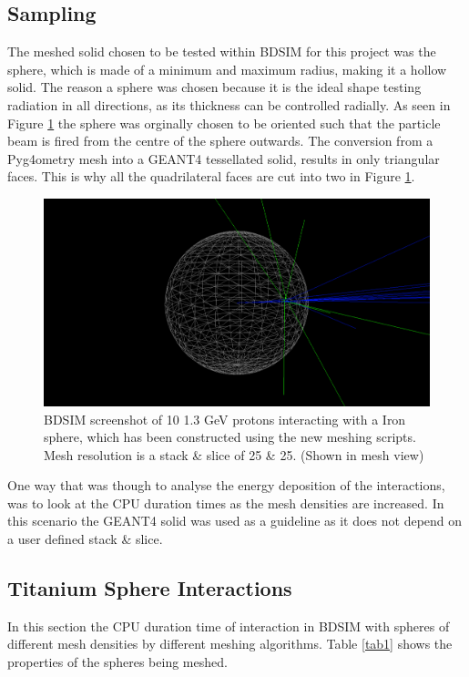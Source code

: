 \documentclass[12pt,a4paper]{article}
\begin{document}
\subsection{Sampling}
The meshed solid chosen to be tested within BDSIM for this project was the sphere, which is made of a minimum and maximum radius, making it a hollow solid. The reason a sphere was chosen because it is the ideal shape testing radiation in all directions, as its thickness can be controlled radially. As seen in Figure \ref{sphbd} the sphere was orginally chosen to be oriented such that the particle beam is fired from the centre of the sphere outwards. The conversion from a Pyg4ometry mesh into a GEANT4 tessellated solid, results in only triangular faces. This is why all the quadrilateral faces are cut into two in Figure \ref{sphbd}.

\begin{figure}[h!]
\centering
\includegraphics[scale=0.35]{Images//BDSIM//ProtonSphere2.png}
\caption[width=\columnwidth]{BDSIM screenshot of 10 1.3 GeV protons interacting with a Iron sphere, which has been constructed using the new meshing scripts. Mesh resolution is a stack \& slice of 25 \& 25. (Shown in mesh view)}
\label{sphbd}
\end{figure}


\noindent One way that was though to analyse the energy deposition of the interactions, was to look at the CPU duration times as the mesh densities are increased. In this scenario the GEANT4 solid was used as a guideline as it does not depend on a user defined stack \& slice. 


\subsection{Titanium Sphere Interactions}

In this section the CPU duration time of interaction in BDSIM with spheres of different mesh densities by different meshing algorithms. Table \ref{tab1} shows the properties of the spheres being meshed.
 
\end{document}
